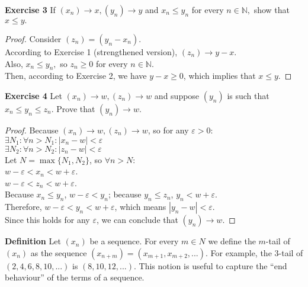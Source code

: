 \documentclass[12pt]{article}
\theoremstyle{definition}
\numberwithin{equation}{subsection}
\begin{document}
\textbf{Exercise 3} If $\left(x_{n}\right) \rightarrow x,\left(y_{n}\right) \rightarrow y$ and $x_{n} \leq y_{n}$ for every $n \in \mathbb{N},$ show that $x \leq y .$
\begin{proof}
    Consider $(z_n) = (y_n - x_n). $ \\
    According to Exercise 1 (strengthened version), $\left(z_{n}\right) \rightarrow y-x$. \\
    Also, $x_{n} \leq y_{n},$  so $z_n \geq 0$ for every $n \in \mathbb{N}$.\\
    Then, according to Exercise 2, we have $y-x\geq 0$, which implies that $x\leq y$. 
\end{proof}


\textbf{Exercise 4} Let $\left(x_{n}\right) \rightarrow w,\left(z_{n}\right) \rightarrow w$ and suppose $\left(y_{n}\right)$ is such that $x_{n} \leq y_{n} \leq z_{n} .$ Prove that $\left(y_{n}\right) \rightarrow w .$
\begin{proof}
    Because $\left(x_{n}\right) \rightarrow w,\left(z_{n}\right) \rightarrow w$, so for any $\varepsilon > 0$: \\
    $\exists N_{1}: \forall n>N_{1}:\left|x_{n}-w\right|<\varepsilon$\\
    $\exists N_{2}: \forall n>N_{2}:\left|z_{n}-w\right|<\varepsilon$\\
    Let $N = \max\{N_1, N_2\}$, so $\forall n > N :$\\
    $w-\varepsilon < x_n < w+\varepsilon$.\\
    $w-\varepsilon < z_n < w+\varepsilon$.\\
    Because $x_{n} \leq y_{n}$,  $w-\varepsilon < y_n $; 
    because $y_{n} \leq z_{n}$,  $y_n < w +\varepsilon$.\\
    Therefore, 
    $w-\varepsilon < y_n < w+\varepsilon$, which means $\left|y_{n}-w\right|<\varepsilon$.\\
    Since this holds for any $\varepsilon$, we can conclude that $\left(y_{n}\right) \rightarrow w .$
    


\end{proof}


\textbf{Definition} Let $(x_n)$ be a sequence. For every $m \in N$ we define the $m$-tail of $(x_n )$ as the sequence $(x_{n+m} ) = (x_{m+1} , x_{m+2}, . . .).$
For example, the $3$-tail of $(2, 4, 6, 8, 10, . . .)$ is $(8, 10, 12, . . .)$.
This notion is useful to capture the ``end behaviour'' of the
terms of a sequence.
\end{document}
